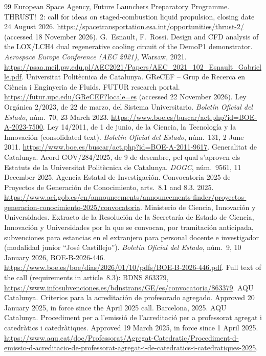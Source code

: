\documentclass[11pt]{article}
\begin{document}
\begin{thebibliography}{99}
 European Space Agency, Future Launchers Preparatory Programme. THRUST!~2: call for ideas on staged-combustion liquid propulsion, closing date 24 August 2026. \url{https://spacetransportation.esa.int/opportunities/thrust-2/} (accessed 18 November 2026).
 G.\ Esnault, F.\ Rossi. Design and CFD analysis of the LOX/LCH4 dual regenerative cooling circuit of the DemoP1 demonstrator. \emph{Aerospace Europe Conference (AEC 2021)}, Warsaw, 2021. \url{https://psaa.meil.pw.edu.pl/AEC2021/Papers/AEC_2021_102_Esnault_Gabrielle.pdf}.
 Universitat Polit\`ecnica de Catalunya. GReCEF -- Grup de Recerca en Ci\`encia i Enginyeria de Fluids. FUTUR research portal. \url{https://futur.upc.edu/GReCEF?locale=es} (accessed 22 November 2026).
 Ley Org\'anica 2/2023, de 22 de marzo, del Sistema Universitario. \emph{Bolet\'in Oficial del Estado}, n\'um.~70, 23 March 2023. \url{https://www.boe.es/buscar/act.php?id=BOE-A-2023-7500}.
 Ley 14/2011, de 1 de junio, de la Ciencia, la Tecnolog\'ia y la Innovaci\'on (consolidated text). \emph{Bolet\'in Oficial del Estado}, n\'um.~131, 2 June 2011. \url{https://www.boe.es/buscar/act.php?id=BOE-A-2011-9617}.
 Generalitat de Catalunya. Acord GOV/284/2025, de 9 de desembre, pel qual s'aproven els Estatuts de la Universitat Polit\`ecnica de Catalunya. \emph{DOGC}, n\'um.~9561, 11 December 2025.
 Agencia Estatal de Investigaci\'on. Convocatoria 2025 de Proyectos de Generaci\'on de Conocimiento, arts.~8.1 and 8.3. 2025. \url{https://www.aei.gob.es/en/announcements/announcements-finder/proyectos-generacion-conocimiento-2025/convocatoria}.
 Ministerio de Ciencia, Innovaci\'on y Universidades. Extracto de la Resoluci\'on de la Secretar\'ia de Estado de Ciencia, Innovaci\'on y Universidades por la que se convocan, por tramitaci\'on anticipada, subvenciones para estancias en el extranjero para personal docente e investigador (modalidad junior ``Jos\'e Castillejo''). \emph{Bolet\'in Oficial del Estado}, n\'um.~9, 10 January 2026, BOE-B-2026-446. {\def\UrlBreaks{\do\/\do\-}\url{https://www.boe.es/boe/dias/2026/01/10/pdfs/BOE-B-2026-446.pdf}}. Full text of the call (requirements in article~8.3): BDNS 863379, \url{https://www.infosubvenciones.es/bdnstrans/GE/es/convocatoria/863379}.
 AQU Catalunya. Criterios para la acreditaci\'on de profesorado agregado. Approved 20 January 2025, in force since the April 2025 call. Barcelona, 2025.
 AQU Catalunya. Procediment per a l'emissi\'o de l'acreditaci\'o per a professorat agregat i catedr\`atics i catedr\`atiques. Approved 19 March 2025, in force since 1 April 2025. {\def\UrlBreaks{\do\/\do\-}\url{https://www.aqu.cat/doc/Professorat/Agregat-Catedratic/Procediment-d-emissio-d-acreditacio-de-professorat-agregat-i-de-catedratics-i-catedratiques-2025}}.

\end{thebibliography}
\end{document}
